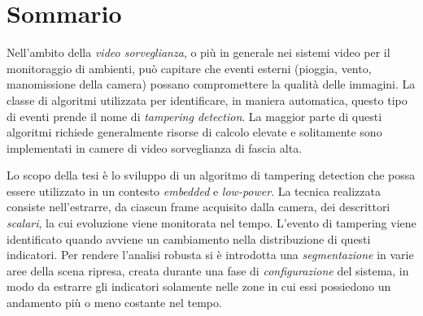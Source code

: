 \newpage
\chapter*{Sommario}


Nell'ambito della \textit{video sorveglianza}, o pi\`u in generale nei sistemi video per il monitoraggio di ambienti, pu\`o capitare che eventi esterni (pioggia, vento, manomissione della camera) possano compromettere la qualit\`a delle immagini. La classe di algoritmi utilizzata per identificare, in maniera automatica,  questo tipo di eventi prende il nome di \textit{tampering detection}. La maggior parte di questi algoritmi richiede generalmente risorse di calcolo elevate e solitamente sono implementati in camere di video sorveglianza di fascia alta.

\vspace{0.5cm}
\noindent
Lo scopo della tesi \`e lo sviluppo di un algoritmo di tampering detection che possa essere utilizzato in un contesto \textit{embedded} e \textit{low-power}. La tecnica realizzata consiste nell'estrarre, da ciascun frame acquisito dalla camera, dei descrittori \textit{scalari}, la cui evoluzione viene monitorata nel tempo. L'evento di tampering viene identificato quando avviene un cambiamento nella distribuzione di questi indicatori. Per rendere l'analisi robusta si \`e introdotta una \textit{segmentazione} in varie aree della scena ripresa, creata durante una fase di \textit{configurazione} del sistema, in modo da estrarre gli indicatori solamente nelle zone in cui essi possiedono un andamento pi\`u o meno costante nel tempo.

